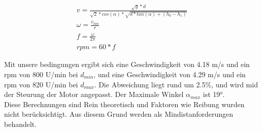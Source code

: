 \begin{gather}
	v=\frac{\sqrt{g}*d}{\sqrt{2}*cos(\alpha)*\sqrt{d*tan(\alpha)+(h_0-h_1)}}\\
	\omega=\frac{v_{tan}}{r}\\
	f=\frac{\omega}{2\pi}\\
	rpm=60*f
\end{gather}

Mit unsere bedingungen ergibt sich eine Geschwindigkeit von 4.18 m/s und ein rpm von 800 U/min bei $d_{min}$, 
und eine Geschwindigkeit von 4.29 m/s und ein rpm von 820 U/min bei $d_{max}$. 
Die Abweichung liegt rund um 2.5\%, und wird mid der Steurung der Motor angepasst.
Der Maximale Winkel $\alpha_{max}$ ist 19°. \\
Diese Berechnungen sind Rein theoretisch und Faktoren wie Reibung wurden nicht berücksichtigt. Aus diesem Grund werden als Mindistanforderungen behandelt.
